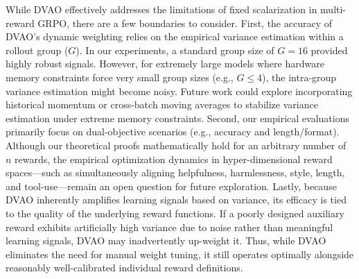 While DVAO effectively addresses the limitations of fixed scalarization in multi-reward GRPO, there are a few boundaries to consider. First, the accuracy of DVAO's dynamic weighting relies on the empirical variance estimation within a rollout group ($G$). In our experiments, a standard group size of $G=16$ provided highly robust signals. However, for extremely large models where hardware memory constraints force very small group sizes (e.g., $G \le 4$), the intra-group variance estimation might become noisy. Future work could explore incorporating historical momentum or cross-batch moving averages to stabilize variance estimation under extreme memory constraints. Second, our empirical evaluations primarily focus on dual-objective scenarios (e.g., accuracy and length/format). Although our theoretical proofs mathematically hold for an arbitrary number of $n$ rewards, the empirical optimization dynamics in hyper-dimensional reward spaces—such as simultaneously aligning helpfulness, harmlessness, style, length, and tool-use—remain an open question for future exploration. Lastly, because DVAO inherently amplifies learning signals based on variance, its efficacy is tied to the quality of the underlying reward functions. If a poorly designed auxiliary reward exhibits artificially high variance due to noise rather than meaningful learning signals, DVAO may inadvertently up-weight it. Thus, while DVAO eliminates the need for manual weight tuning, it still operates optimally alongside reasonably well-calibrated individual reward definitions.